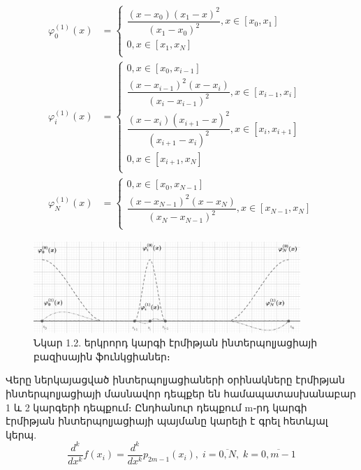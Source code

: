 \documentclass[fleqn, bachelor,subf,12pt,notitlepage]{article}
\begin{document}
\begin{equation}
\begin{aligned}
\varphi^{(1)}_{0}\left(x\right)&=\begin{cases}
\dfrac{\left(x-x_{0}\right)\left(x_{1}-x\right)^{2}}{\left(x_{1}-x_{0}\right)^{2}}, x\in \left[x_{0}, x_{1}\right]\\
0, x\in \left[x_{1}, x_{N}\right]\\
\end{cases}\\
\varphi^{(1)}_{i}\left(x\right)&=\begin{cases}
0, x\in \left[x_{0}, x_{i-1}\right]\\
\dfrac{\left(x-x_{i-1}\right)^2\left(x-x_{i}\right)}{\left(x_{i}-x_{i-1}\right)^{2}}, x\in \left[x_{i-1}, x_{i}\right]\\
\dfrac{\left(x-x_{i}\right)\left(x_{i+1}-x\right)^{2}}{\left(x_{i+1}-x_{i}\right)^{2}}, x\in \left[x_{i}, x_{i+1}\right]\\
0, x\in \left[x_{i+1}, x_{N}\right]\\
\end{cases}\\
\varphi^{(1)}_{N}\left(x\right)&=\begin{cases}
0, x\in \left[x_{0}, x_{N-1}\right]\\
\dfrac{\left(x-x_{N-1}\right)^{2}\left(x-x_{N}\right)}{\left(x_{N}-x_{N-1}\right)^{2}}, x\in \left[x_{N-1}, x_{N}\right]\\
\end{cases}
\end{aligned}
\end{equation}

\begin{figure}[h]
\centering
\includegraphics[width=0.9\textwidth]{images/one_var_quadratic}
\captionsetup{labelformat=empty}
\caption{Նկար 1.2. երկրորդ կարգի էրմիթյան ինտերպոլյացիայի բազիսային ֆունկցիաներ։}
\end{figure}
Վերը ներկայացված ինտերպոլյացիաների օրինակները էրմիթյան ինտերպոլյացիայի մասնավոր դեպքեր են համապատասխանաբար 1 և 2 կարգերի դեպքում։
Ընդհանուր դեպքում m֊րդ կարգի էրմիթյան ինտերպոլյացիայի պայմանը կարելի է գրել հետևյալ կերպ.
\begin{equation}
\dfrac{d^{k}}{dx^{k}}f\left(x_{i}\right)=\dfrac{d^{k}}{dx^{k}}p_{2m-1}\left(x_{i}\right), \;  i=\overline{0, N}, \;  k=\overline{0, m-1}
\end{equation}
\newpage
\end{document}
